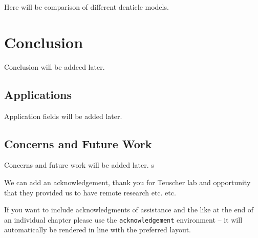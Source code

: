 \documentclass[graybox]{svmult}
\begin{document}
Here will be comparison of different denticle models.

\section{Conclusion}
\label{sec:5}
Conclusion will be addeed later. 

\subsection{Applications} %
Application fields will be added later.

\subsection{Concerns and Future Work} %
Concerns and future work will be added later. s


\begin{acknowledgement}
We can add an acknowledgement, thank you for Teuscher lab and opportunity that they provided us to have remote research etc. etc.

  If you want to include acknowledgments of assistance and the like at the end of an individual chapter please use the \verb|acknowledgement| environment -- it will automatically be rendered in line with the preferred layout.
\end{acknowledgement}



 

\end{document}
